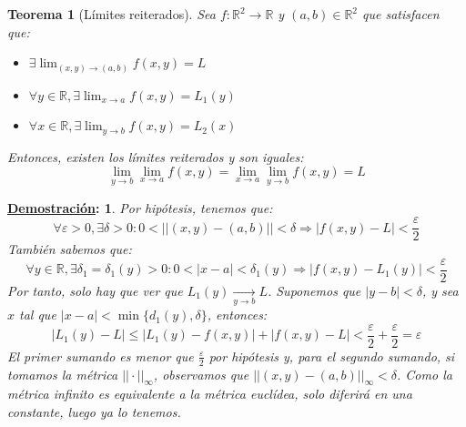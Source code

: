 \documentclass[10pt,a4paper,openright]{book}
\theoremstyle{break}
\newtheorem*{theo}{Teorema}
\newtheorem*{demo}{\underline{Demostración}:}
\begin{document}
\begin{theo}[Límites reiterados]
Sea $f: \mathbb{R}^2 \longrightarrow \mathbb{R}$ y $(a,b) \in \mathbb{R}^2$ que satisfacen que:
\begin{itemize}
\item $\exists \lim_{(x,y) \to (a,b)} f(x,y) = L$
\item $\forall y \in \mathbb{R}, \exists \lim_{x \to a} f(x,y) = L_1 (y)$
\item $\forall x \in \mathbb{R}, \exists \lim_{y \to b} f(x,y) = L_2 (x)$
\end{itemize}
Entonces, existen los límites reiterados y son iguales:
$$ \lim_{y \to b} \lim_{x \to a} f(x,y) =   \lim_{x \to a} \lim_{y \to b} f(x,y) = L$$
\end{theo}

\begin{demo}
Por hipótesis, tenemos que:
$$\forall \varepsilon > 0, \exists \delta > 0 : 0 < || (x,y) - (a,b) || < \delta \Rightarrow |f(x,y) - L | < \frac{\varepsilon}{2}$$
También sabemos que:
$$\forall y \in \mathbb{R}, \exists \delta_1 = \delta_1 (y) > 0 : 0 < |x-a| < \delta_1 (y) \Rightarrow |f(x,y) - L_1 (y)| < \frac{\varepsilon}{2}$$
Por tanto, solo hay que ver que $L_1 (y) \xrightarrow[y\rightarrow b]{} L$. Suponemos que $|y-b| < \delta$, y sea $x$ tal que $|x - a| < \min\{d_1 (y), \delta\}$, entonces:
$$|L_1 (y) - L | \leq |L_1 (y) - f(x,y)| + |f(x,y) - L| < \frac{\varepsilon}{2}  + \frac{\varepsilon}{2} = \varepsilon$$
El primer sumando es menor que $\frac{\varepsilon}{2}$ por hipótesis y, para el segundo sumando, si tomamos la métrica $||\cdot||_\infty$, observamos que $||(x,y) - (a,b)||_\infty < \delta$. Como la métrica infinito es equivalente a la métrica euclídea, solo diferirá en una constante, luego ya lo tenemos.
\end{demo}
\end{document}
